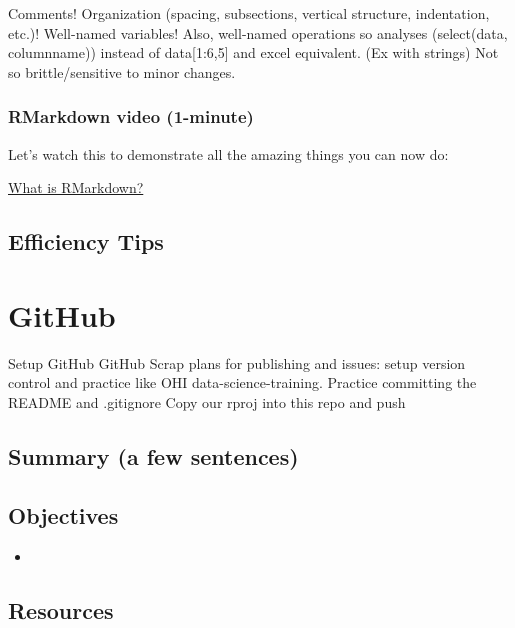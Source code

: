 \documentclass[]{book}
\begin{document}
Comments! Organization (spacing, subsections, vertical structure, indentation, etc.)! Well-named variables! Also, well-named operations so analyses (select(data, columnname)) instead of data{[}1:6,5{]} and excel equivalent. (Ex with strings)
Not so brittle/sensitive to minor changes.

\hypertarget{rmarkdown-video-1-minute}{%
\subsection{RMarkdown video (1-minute)}\label{rmarkdown-video-1-minute}}

Let's watch this to demonstrate all the amazing things you can now do:

\href{https://vimeo.com/178485416}{What is RMarkdown?}

\hypertarget{efficiency-tips-1}{%
\section{Efficiency Tips}\label{efficiency-tips-1}}

\hypertarget{github}{%
\chapter{GitHub}\label{github}}

Setup GitHub
GitHub
Scrap plans for publishing and issues: setup version control and practice like OHI data-science-training.
Practice committing the README and .gitignore
Copy our rproj into this repo and push

\hypertarget{summary-a-few-sentences-2}{%
\section{Summary (a few sentences)}\label{summary-a-few-sentences-2}}

\hypertarget{objectives}{%
\section{Objectives}\label{objectives}}

\begin{itemize}
\item
\end{itemize}

\hypertarget{resources-2}{%
\section{Resources}\label{resources-2}}
\end{document}
